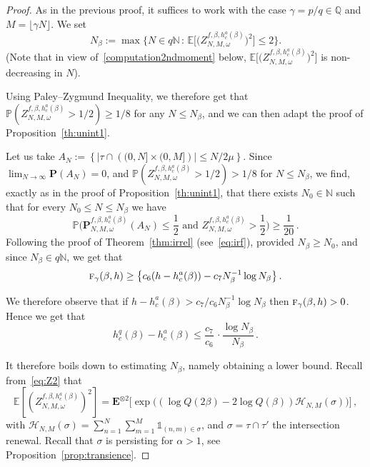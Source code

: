 \documentclass[10pt]{amsart}
\theoremstyle{definition}\newtheorem{defi}[theo]{Definition}\newtheorem{rema}[theo]{Remark}\newtheorem{exam}[theo]{Example}\newtheorem{exem}[theo]{Example}\newtheorem{nota}[theo]{Notation}
\newcommand{\ga}{\alpha}
\newcommand{\gb}{\beta}
\newcommand{\go}{\omega}
\newcommand{\unbf}%
{\mathds{1}}
\newcommand{\tf}{\textsc{f}} %
\newcommand{\cH}{\ensuremath{\mathcal{H}}}
\newcommand{\bP}{\ensuremath{\mathbf{P}}}
\newcommand{\bE}{\ensuremath{\mathbf{E}}}
\newcommand{\bbE}{\ensuremath{\mathbb{E}}}
\newcommand{\bbN}{\ensuremath{\mathbb{N}}}
\newcommand{\bbP}{\ensuremath{\mathbb{P}}}
\newcommand{\bbQ}{\ensuremath{\mathbb{Q}}}
\begin{document}
\begin{proof}
As in the previous proof, it suffices to work with the case $\gamma = p/q\in \bbQ$ and $M=\lfloor \gamma N \rfloor$. We set
\begin{equation}
N_\beta := \max \Big \lbrace N \in q\bbN\,:\,\bbE \Big[\Big(Z^{f,\beta,h_c^a(\beta)}_{N,M,\omega} \Big)^2 \Big] \le 2 \Big \rbrace.
\end{equation}
(Note that in view of~\eqref{computation2ndmoment} below, $\bbE \big[\big(Z^{f,\beta,h_c^a(\beta)}_{N,M,\omega} \big)^2 \big]$ is non-decreasing in $N$).

Using Paley--Zygmund Inequality, we therefore get that $\bbP(Z_{N,M,\go}^{f,\beta,h_c^a(\beta)} >1/2) \geq 1/8$ for any $N\leq N_{\gb}$, and we can then adapt the proof of Proposition~\ref{th:unint1}.

Let us take $A_{N} :=\left\lbrace \vert \tau \cap \left((0,N] \times (0,M] \right) \rvert \le N/{2 \mu} \right\rbrace$. Since $\lim_{N \to \infty} \bP(A_N) =0$, and $\bbP(Z_{N,M,\go}^{f,\beta,h_c^a(\beta)} >1/2) >1/8$ for $N\leq N_{\gb}$, we find, exactly as in the proof of Proposition~\ref{th:unint1}, that there exists $N_0 \in \bbN$ such that for every $N_0 \le N \le N_\beta$ we have
\begin{equation}
\bbP \Big(\bP^{f,\gb,h_c^{a}(\gb)}_{N,M,\omega} (A_N)\le \frac{1}{2}
\text{ and } Z^{f,\gb,h_c^{a}(\gb)}_{N,M,\omega} > \frac{1}{2} \Big) \ge \frac{1}{20}\,.
\end{equation}
Following the proof of Theorem~\ref{thm:irrel} (see~\eqref{eq:irf}), provided $N_{\gb} \geq N_0$, and since $N_{\gb} \in q\bbN$, we get that
\begin{equation}
\tf_{\gamma}(\gb,h) \geq \big \{ c_6 (h- h_c^a(\beta)) - c_7 N_{\gb}^{-1} \log N_{\gb} \big \}\,.
\end{equation}

We therefore observe that if $h- h_c^a(\beta) > c_7/c_6 N_{\gb}^{-1} \log N_{\gb}$ then $\tf_\gamma(\beta,h) >0$. Hence we get that
\begin{equation}\label{eq:hNbeta}
h_c^ q(\beta) - h_c ^a(\beta) \le \frac{c_7}{c_6}\,\cdot \frac{\log N_\beta}{N_\beta}\,.
\end{equation}


It therefore boils down to estimating $N_\beta$, namely obtaining a lower bound. Recall from~\eqref{eq:Z2} that
\begin{equation}\label{computation2ndmoment}
\bbE \left[\left(Z^{f,\beta,h_c^a(\beta)}_{N,M,\omega} \right)^2 \right] = \bE^{\otimes 2} \Big[\exp \Big((\log Q(2 \beta) - 2 \log Q(\beta)) \cH_{N,M}(\sigma) \Big) \Big]\,,
\end{equation}
with $\cH_{N,M}(\sigma) = \sum_{n=1}^N \sum_{m=1}^M \unbf_{(n,m) \in \sigma}$, and $\sigma = \tau \cap \tau'$ the intersection renewal. Recall that $\sigma$ is persisting for $\ga > 1$, see Proposition~\ref{prop:transience}.


\end{proof}
\end{document}
